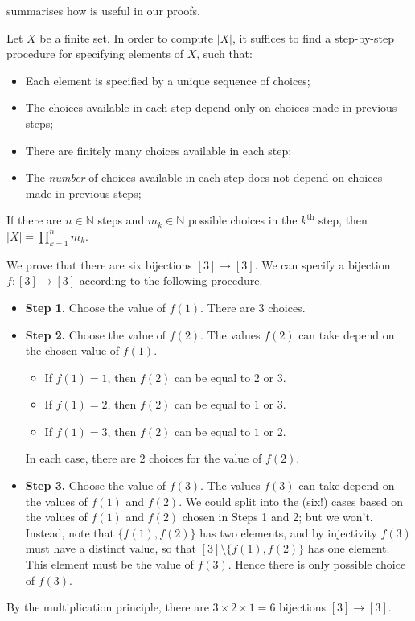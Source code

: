 summarises how  is useful in our proofs.

\begin{strategy}
\label{strMultiplicationPrinciple}
Let $X$ be a finite set. In order to compute $|X|$, it suffices to find a step-by-step procedure for specifying elements of $X$, such that:
\vspace{5pt}
\begin{itemize}
\item Each element is specified by a unique sequence of choices;
\item The choices available in each step depend only on choices made in previous steps;
\item There are finitely many choices available in each step;
\item The \textit{number} of choices available in each step does not depend on choices made in previous steps;
\end{itemize}
\vspace{5pt}
If there are $n \in \mathbb{N}$ steps and $m_k \in \mathbb{N}$ possible choices in the $k^{\text{th}}$ step, then $|X| = \prod_{k=1}^n m_k$.
\end{strategy}

\begin{example}
We prove that there are six bijections $[3] \to [3]$. We can specify a bijection $f : [3] \to [3]$ according to the following procedure.
\begin{itemize}
\item \textbf{Step 1.} Choose the value of $f(1)$. There are $3$ choices.
\item \textbf{Step 2.} Choose the value of $f(2)$. The values $f(2)$ can take depend on the chosen value of $f(1)$.
\begin{itemize}
\item If $f(1)=1$, then $f(2)$ can be equal to $2$ or $3$.
\item If $f(1)=2$, then $f(2)$ can be equal to $1$ or $3$.
\item If $f(1)=3$, then $f(2)$ can be equal to $1$ or $2$.
\end{itemize}
In each case, there are $2$ choices for the value of $f(2)$.
\item \textbf{Step 3.} Choose the value of $f(3)$. The values $f(3)$ can take depend on the values of $f(1)$ and $f(2)$. We could split into the (six!) cases based on the values of $f(1)$ and $f(2)$ chosen in Steps 1 and 2; but we won't. Instead, note that $\{f(1),f(2)\}$ has two elements, and by injectivity $f(3)$ must have a distinct value, so that $[3] \setminus \{ f(1),f(2) \}$ has one element. This element must be the value of $f(3)$. Hence there is only possible choice of $f(3)$.
\end{itemize}
By the multiplication principle, there are $3 \times 2 \times 1 = 6$ bijections $[3] \to [3]$.
\end{example}

